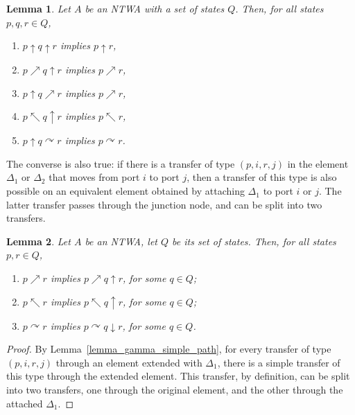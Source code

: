 \documentclass[12pt,a4paper]{article}
\newtheorem{lemma}{Lemma}
\theoremstyle{definition}
\begin{document}
\begin{lemma} \label{lemma_swallowing_delta_1}
Let $A$ be an NTWA with a set of states $Q$.
Then, for all states $p,q,r \in Q$,
\begin{enumerate}\renewcommand{\theenumi}{\alph{enumi}}
	\renewcommand{\labelenumi}{(\alph{enumi})}
\item	\label{lemma_swallowing_delta_1__p_up_q_up_r__p_up_r}
	$p \uparrow q \uparrow r$ implies $p \uparrow r$,
\item	\label{lemma_swallowing_delta_1__p_ne_q_up_r__p_ne_r}
	$p \nearrow q \uparrow r$ implies $p \nearrow r$,
\item	\label{lemma_swallowing_delta_1__p_up_q_ne_r__p_ne_r}
	$p \uparrow q \nearrow r$ implies $p \nearrow r$,
\item	\label{lemma_swallowing_delta_1__p_nw_q_up_r__p_nw_r}
	$p \nwarrow q \uparrow r$ implies $p \nwarrow r$,
\item	\label{lemma_swallowing_delta_1__p_up_q_right_r__p_right_r}
	$p \uparrow q \curvearrowright r$ implies $p \curvearrowright r$.
\end{enumerate}
\end{lemma}

The converse is also true:
if there is a transfer of type $(p,i,r,j)$ in the element $\Delta_1$
or $\Delta_2$ that moves from port $i$ to port $j$,
then a transfer of this type is also possible on an equivalent element
obtained by attaching $\Delta_1$ to port $i$ or $j$.
The latter transfer passes through the junction node,
and can be split into two transfers.

\begin{lemma} \label{lemma_inserting_delta_1}
Let $A$ be an NTWA, let $Q$ be its set of states.
Then, for all states $p,r \in Q$,
\begin{enumerate}\renewcommand{\theenumi}{\alph{enumi}}
	\renewcommand{\labelenumi}{(\alph{enumi})}
\item \label{lemma_inserting_delta_1_p_nearrow_q}
	$p \nearrow r$ implies $p \nearrow q \uparrow r$, for some $q \in Q$;
\item \label{lemma_inserting_delta_1_p_nwarrow_q}	
	$p \nwarrow r$ implies $p \nwarrow q \uparrow r$, for some $q \in Q$;
\item \label{lemma_inserting_delta_1_p_curvearrowright_q}	
$p \curvearrowright r$ implies $p\curvearrowright q \downarrow r$, for some $q \in Q$.
\end{enumerate}
\end{lemma}
\begin{proof}
By Lemma~\ref{lemma_gamma_simple_path},
for every transfer of type $(p,i,r,j)$ through an element extended with $\Delta_1$,
there is a simple transfer of this type through the extended element.
This transfer, by definition, can be split into two transfers,
one through the original element, and the other through the attached $\Delta_1$.
\end{proof}
\end{document}

